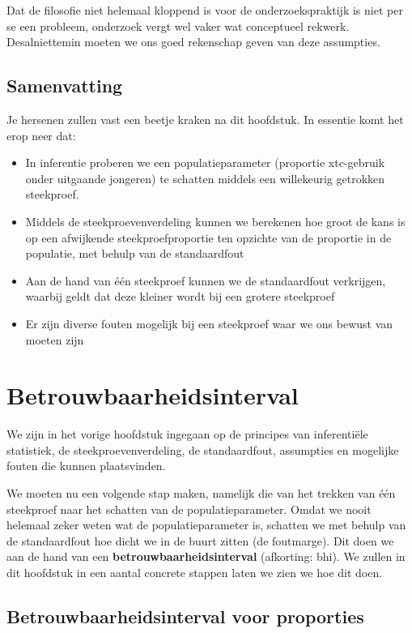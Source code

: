 \documentclass[
  letterpaper,
  DIV=11,
  numbers=noendperiod]{scrreprt}
\providecommand{\tightlist}{%
  \setlength{\itemsep}{0pt}\setlength{\parskip}{0pt}}
\begin{document}
Dat de filosofie niet helemaal kloppend is voor de onderzoekspraktijk is
niet per se een probleem, onderzoek vergt wel vaker wat conceptueel
rekwerk. Desalniettemin moeten we ons goed rekenschap geven van deze
assumpties.

\section{Samenvatting}\label{samenvatting-1}

Je hersenen zullen vast een beetje kraken na dit hoofdstuk. In essentie
komt het erop neer dat:

\begin{itemize}
\tightlist
\item
  In inferentie proberen we een populatieparameter (proportie
  xtc-gebruik onder uitgaande jongeren) te schatten middels een
  willekeurig getrokken steekproef.
\item
  Middels de steekproevenverdeling kunnen we berekenen hoe groot de kans
  is op een afwijkende steekproefproportie ten opzichte van de proportie
  in de populatie, met behulp van de standaardfout
\item
  Aan de hand van één steekproef kunnen we de standaardfout verkrijgen,
  waarbij geldt dat deze kleiner wordt bij een grotere steekproef
\item
  Er zijn diverse fouten mogelijk bij een steekproef waar we ons bewust
  van moeten zijn
\end{itemize}

\chapter{Betrouwbaarheidsinterval}\label{betrouwbaarheidsinterval}

We zijn in het vorige hoofdstuk ingegaan op de principes van
inferentiële statistiek, de steekproevenverdeling, de standaardfout,
assumpties en mogelijke fouten die kunnen plaatsvinden.

We moeten nu een volgende stap maken, namelijk die van het trekken van
één steekproef naar het schatten van de populatieparameter. Omdat we
nooit helemaal zeker weten wat de populatieparameter is, schatten we met
behulp van de standaardfout hoe dicht we in de buurt zitten (de
foutmarge). Dit doen we aan de hand van een
\textbf{betrouwbaarheidsinterval} (afkorting: bhi). We zullen in dit
hoofdstuk in een aantal concrete stappen laten we zien we hoe dit doen.

\section{Betrouwbaarheidsinterval voor
proporties}\label{betrouwbaarheidsinterval-voor-proporties}
\end{document}
